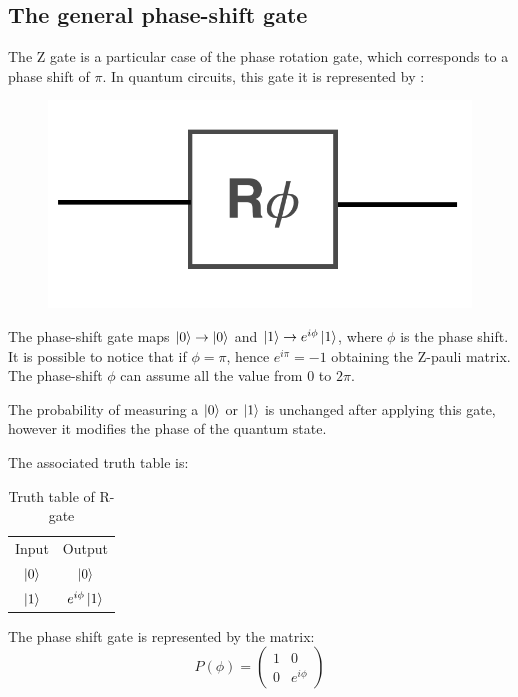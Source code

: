 \subsection*{The general phase-shift gate}
The Z gate is a particular case of the phase rotation gate, which corresponds to a phase shift of $\pi$. In quantum circuits, this gate it is represented by :
\begin{figure}[H]
\centering
\includegraphics[scale=0.15]{Mainmatter/images/Phase_shift_gate.png}
\end{figure}
The phase-shift gate maps $\ket{0} \to \ket{0}$ and $\ket{1} \to e^{i\phi}\ket{1}$, where $\phi$ is the phase shift. It is possible to notice that if $\phi=\pi$, hence $e^{i\pi}=-1$ obtaining the Z-pauli matrix. The phase-shift $\phi$ can assume all the value from 0 to $2\pi$.

The probability of measuring a $\ket{0}$ or $\ket{1}$ is unchanged after applying this gate, however it modifies the phase of the quantum state.

The associated truth table is: 
\begin{table}[h!]
    \centering
    \begin{tabular}{c|c}
         Input & Output \\
          $\ket{0}$ & $\ket{0}$ \\
          $\ket{1}$ & $e^{i\phi}\ket{1}$
    \end{tabular}
    \caption{Truth table of R-gate}
    \label{tab:rotationgate}
\end{table}

The phase shift gate is represented by the matrix:
\begin{equation*}
     P(\phi)=  \left(\begin{array}{cc}
1 & 0 \\
0 & e^{i\phi}
\end{array}\right)  
\end{equation*}





